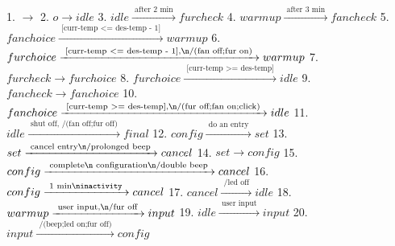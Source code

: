 1. $ \xrightarrow {\text {  }} $
2. $o \xrightarrow {\text {  }} idle$
3. $idle \xrightarrow {\text { after 2 min }} furcheck$
4. $warmup \xrightarrow {\text { after 3 min }} fancheck$
5. $fanchoice \xrightarrow {\text { [curr-temp <= des-temp - 1] }} warmup$
6. $furchoice \xrightarrow {\text { [curr-temp <= des-temp - 1],\n/(fan off;fur on) }} warmup$
7. $furcheck \xrightarrow {\text {  }} furchoice$
8. $furchoice \xrightarrow {\text { [curr-temp >= des-temp] }} idle$
9. $fancheck \xrightarrow {\text {  }} fanchoice$
10. $fanchoice \xrightarrow {\text { [curr-temp >= des-temp],\n/(fur off;fan on;click) }} idle$
11. $idle \xrightarrow {\text { shut off, /(fan off;fur off) }} final$
12. $config \xrightarrow {\text { do an entry }} set$
13. $set \xrightarrow {\text { cancel entry\n/prolonged beep }} cancel$
14. $set \xrightarrow {\text {  }} config$
15. $config \xrightarrow {\text { complete\n configuration\n/double beep }} cancel$
16. $config \xrightarrow {\text { 1 min\ninactivity }} cancel$
17. $cancel \xrightarrow {\text { /led off }} idle$
18. $warmup \xrightarrow {\text { user input,\n/fur off }} input$
19. $idle \xrightarrow {\text { user input }} input$
20. $input \xrightarrow {\text { /(beep;led on;fur off) }} config$